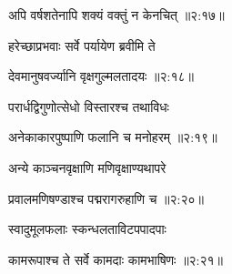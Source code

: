 
{\devanagarifont अपि वर्षशतेनापि शक्यं वक्तुं न केनचित् {॥२:१७॥} \veg\dontdisplaylinenum }%
 
{\devanagarifont हरेच्छाप्रभवाः सर्वे पर्यायेण ब्रवीमि ते \thinspace{\dandab} \dontdisplaylinenum }%


{\devanagarifont देवमानुषवर्ज्यानि वृक्षगुल्मलतादयः {॥२:१८॥} \veg\dontdisplaylinenum }%

{\devanagarifont परार्धद्विगुणोत्सेधो विस्तारश्च तथाविधः \thinspace{\dandab} \dontdisplaylinenum }%


{\devanagarifont अनेकाकारपुष्पाणि फलानि च मनोहरम् {॥२:१९॥} \veg\dontdisplaylinenum }%

{\devanagarifont अन्ये काञ्चनवृक्षाणि मणिवृक्षाण्यथापरे \thinspace{\dandab} \dontdisplaylinenum }%


{\devanagarifont प्रवालमणिषण्डाश्च पद्मरागरुहाणि च {॥२:२०॥} \veg\dontdisplaylinenum }%

{\devanagarifont स्वादुमूलफलाः स्कन्धलताविटपपादपाः \thinspace{\dandab} \dontdisplaylinenum }%


{\devanagarifont कामरूपाश्च ते सर्वे कामदाः कामभाषिणः {॥२:२१॥} \veg\dontdisplaylinenum }%
  
